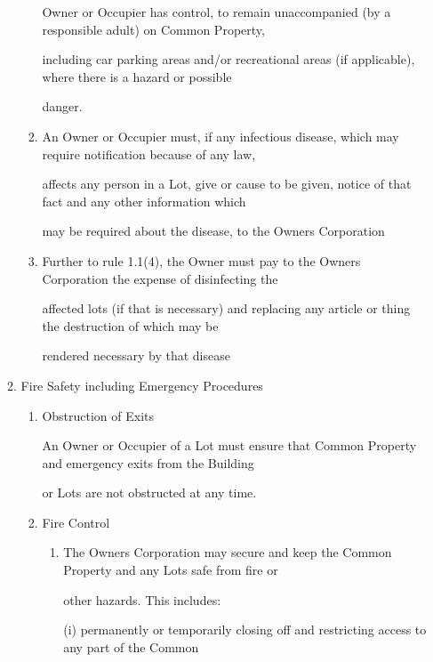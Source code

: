 \documentclass{article}
\begin{document}
\begin{enumerate}[label=\arabic*.]
\begin{enumerate}[label=\arabic{enumi}.\arabic*.]
\begin{enumerate}[label=(\arabic*)]
{\fontsize{10.02}{1}Owner or Occupier has control, to remain unaccompanied (by a responsible adult) on Common Property, }

{\fontsize{10.02}{1}including car parking areas and/or recreational areas (if applicable), where there is a hazard or possible }

{\fontsize{10.02}{1}danger. }

\item {\fontsize{9.962}{1} An Owner or Occupier must, if any infectious disease, which may require notification because of any law, }

{\fontsize{10.02}{1}affects any person in a Lot, give or cause to be given, notice of that fact and any other information which }

{\fontsize{10.02}{1}may be required about the disease, to the Owners Corporation }

\item {\fontsize{9.962}{1} Further to rule 1.1(4), the Owner must pay to the Owners Corporation the expense of disinfecting the }

{\fontsize{10.02}{1}affected lots (if that is necessary) and replacing any article or thing the destruction of which may be }

{\fontsize{10.02}{1}rendered necessary by that disease }

\end{enumerate}
\item {\fontsize{9.99}{1} Fire Safety including Emergency Procedures }

\begin{enumerate}[label=(\arabic*)]
\item {\fontsize{9.962}{1} Obstruction of Exits }

{\fontsize{10.02}{1}An Owner or Occupier of a Lot must ensure that Common Property and emergency exits from the Building }

{\fontsize{10.02}{1}or Lots are not obstructed at any time. }

\item {\fontsize{9.962}{1} Fire Control }

\begin{enumerate}[label=(\alph*)]
\item {\fontsize{9.962}{1} The Owners Corporation may secure and keep the Common Property and any Lots safe from fire or }

{\fontsize{10.02}{1}other hazards. This includes: }

{\fontsize{9.962}{1}(i) permanently or temporarily closing off and restricting access to any part of the Common }


\end{enumerate}
\end{enumerate}
\end{enumerate}
\end{enumerate}
\end{document}
